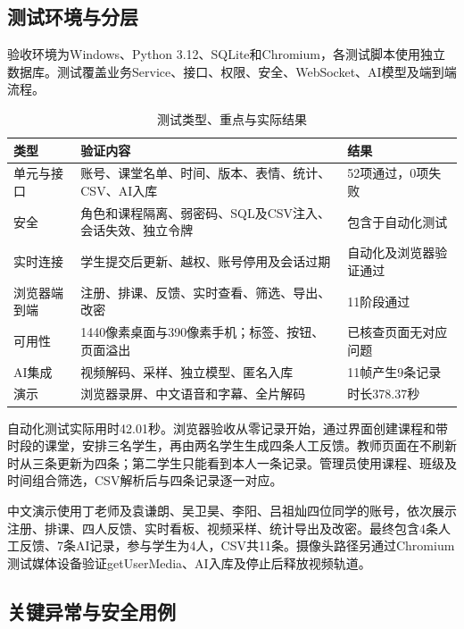 \documentclass[UTF8,a4paper,zihao=-4,fontset=fandol]{ctexart}
\begin{document}
\subsection{测试环境与分层}

验收环境为Windows、Python 3.12、SQLite和Chromium，各测试脚本使用独立数据库。测试覆盖业务Service、接口、权限、安全、WebSocket、AI模型及端到端流程。

\begin{table}[H]\centering\small
\caption{测试类型、重点与实际结果}
\begin{tabularx}{\textwidth}{p{2.4cm}Yp{3.1cm}}
\toprule 类型 & 验证内容 & 结果\\\midrule
单元与接口 & 账号、课堂名单、时间、版本、表情、统计、CSV、AI入库 & 52项通过，0项失败\\
安全 & 角色和课程隔离、弱密码、SQL及CSV注入、会话失效、独立令牌 & 包含于自动化测试\\
实时连接 & 学生提交后更新、越权、账号停用及会话过期 & 自动化及浏览器验证通过\\
浏览器端到端 & 注册、排课、反馈、实时查看、筛选、导出、改密 & 11阶段通过\\
可用性 & 1440像素桌面与390像素手机；标签、按钮、页面溢出 & 已核查页面无对应问题\\
AI集成 & 视频解码、采样、独立模型、匿名入库 & 11帧产生9条记录\\
演示 & 浏览器录屏、中文语音和字幕、全片解码 & 时长378.37秒\\
\bottomrule\end{tabularx}\end{table}

自动化测试实际用时42.01秒。浏览器验收从零记录开始，通过界面创建课程和带时段的课堂，安排三名学生，再由两名学生生成四条人工反馈。教师页面在不刷新时从三条更新为四条；第二学生只能看到本人一条记录。管理员使用课程、班级及时间组合筛选，CSV解析后与四条记录逐一对应。

中文演示使用丁老师及袁谦朗、吴卫昊、李阳、吕祖灿四位同学的账号，依次展示注册、排课、四人反馈、实时看板、视频采样、统计导出及改密。最终包含4条人工反馈、7条AI记录，参与学生为4人，CSV共11条。摄像头路径另通过Chromium测试媒体设备验证getUserMedia、AI入库及停止后释放视频轨道。

\subsection{关键异常与安全用例}
\end{document}
